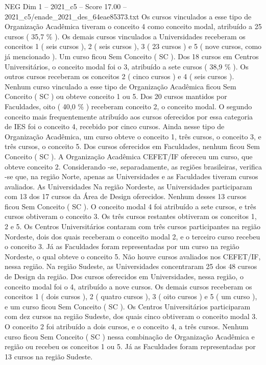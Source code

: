 \begin{textsample}{NEG Dim 1 – 2021\_c5 – Score 17.00 – 2021\_c5/enade\_2021\_des\_64eae85373.txt}
Os cursos vinculados a esse tipo de Organização Acadêmica tiveram o conceito 4 como conceito modal, atribuído a 25 cursos ( 35,7 \% ).
Os demais cursos vinculados a Universidades receberam os conceitos 1 ( seis cursos ), 2 ( seis cursos ), 3 ( 23 cursos ) e 5 ( nove cursos, como já mencionado ).
Um curso ficou Sem Conceito ( SC ).
Dos 18 cursos em Centros Universitários, o conceito modal foi o 3, atribuído a sete cursos ( 38,9 \% ).
Os outros cursos receberam os conceitos 2 ( cinco cursos ) e 4 ( seis cursos ).
Nenhum curso vinculado a esse tipo de Organização Acadêmica ficou Sem Conceito ( SC ) ou obteve conceito 1 ou 5.
Dos 20 cursos mantidos por Faculdades, oito ( 40,0 \% ) receberam conceito 2, o conceito modal.
O segundo conceito mais frequentemente atribuído aos cursos oferecidos por essa categoria de IES foi o conceito 4, recebido por cinco cursos.
Ainda nesse tipo de Organização Acadêmica, um curso obteve o conceito 1, três cursos, o conceito 3, e três cursos, o conceito 5.
Dos cursos oferecidos em Faculdades, nenhum ficou Sem Conceito ( SC ).
A Organização Acadêmica CEFET/IF ofereceu um curso, que obteve conceito 2.
Considerando -se, separadamente, as regiões brasileiras, verifica -se que, na região Norte, apenas as Universidades e as Faculdades tiveram cursos avaliados.
As Universidades Na região Nordeste, as Universidades participaram com 13 dos 17 cursos da Área de Design oferecidos.
Nenhum desses 13 cursos ficou Sem Conceito ( SC ).
O conceito modal 4 foi atribuído a sete cursos, e três cursos obtiveram o conceito 3.
Os três cursos restantes obtiveram os conceitos 1, 2 e 5.
Os Centros Universitários contaram com três cursos participantes na região Nordeste, dois dos quais receberam o conceito modal 2, e o terceiro curso recebeu o conceito 3.
Já as Faculdades foram representadas por um curso na região Nordeste, o qual obteve o conceito 5.
Não houve cursos avaliados nos CEFET/IF, nessa região.
Na região Sudeste, as Universidades concentraram 25 dos 48 cursos de Design da região.
Dos cursos oferecidos em Universidades, nessa região, o conceito modal foi o 4, atribuído a nove cursos.
Os demais cursos receberam os conceitos 1 ( dois cursos ), 2 ( quatro cursos ), 3 ( oito cursos ) e 5 ( um curso ), e um curso ficou Sem Conceito ( SC ).
Os Centros Universitários participaram com dez cursos na região Sudeste, dos quais cinco obtiveram o conceito modal 3.
O conceito 2 foi atribuído a dois cursos, e o conceito 4, a três cursos.
Nenhum curso ficou Sem Conceito ( SC ) nessa combinação de Organização Acadêmica e região ou recebeu os conceitos 1 ou 5.
Já as Faculdades foram representadas por 13 cursos na região Sudeste.

\end{textsample}

